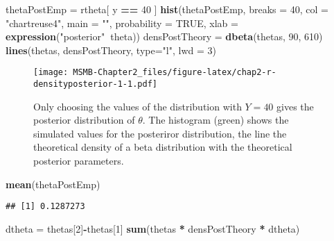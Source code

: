 \documentclass[]{article}
\newenvironment{Shaded}{\begin{snugshade}}{\end{snugshade}}
\newcommand{\KeywordTok}[1]{\textcolor[rgb]{0.13,0.29,0.53}{\textbf{#1}}}
\newcommand{\DataTypeTok}[1]{\textcolor[rgb]{0.13,0.29,0.53}{#1}}
\newcommand{\DecValTok}[1]{\textcolor[rgb]{0.00,0.00,0.81}{#1}}
\newcommand{\StringTok}[1]{\textcolor[rgb]{0.31,0.60,0.02}{#1}}
\newcommand{\OtherTok}[1]{\textcolor[rgb]{0.56,0.35,0.01}{#1}}
\newcommand{\OperatorTok}[1]{\textcolor[rgb]{0.81,0.36,0.00}{\textbf{#1}}}
\newcommand{\NormalTok}[1]{#1}
\begin{document}
\begin{Shaded}
\begin{Highlighting}[]
\NormalTok{thetaPostEmp =}\StringTok{ }\NormalTok{rtheta[ y }\OperatorTok{==}\StringTok{ }\DecValTok{40}\NormalTok{ ]}
\KeywordTok{hist}\NormalTok{(thetaPostEmp, }\DataTypeTok{breaks =} \DecValTok{40}\NormalTok{, }\DataTypeTok{col =} \StringTok{"chartreuse4"}\NormalTok{, }\DataTypeTok{main =} \StringTok{""}\NormalTok{,}
     \DataTypeTok{probability =} \OtherTok{TRUE}\NormalTok{, }\DataTypeTok{xlab =} \KeywordTok{expression}\NormalTok{(}\StringTok{"posterior"}\OperatorTok{~}\NormalTok{theta))}
\NormalTok{densPostTheory  =}\StringTok{  }\KeywordTok{dbeta}\NormalTok{(thetas, }\DecValTok{90}\NormalTok{, }\DecValTok{610}\NormalTok{)}
\KeywordTok{lines}\NormalTok{(thetas, densPostTheory, }\DataTypeTok{type=}\StringTok{"l"}\NormalTok{, }\DataTypeTok{lwd =} \DecValTok{3}\NormalTok{)}
\end{Highlighting}
\end{Shaded}

\begin{figure}
\centering
\texttt{[image: MSMB-Chapter2\_files/figure-latex/chap2-r-densityposterior-1-1.pdf]}
\caption{Only choosing the values of the distribution with \(Y=40\)
gives the posterior distribution of \(\theta\). The histogram (green)
shows the simulated values for the posteriror distribution, the line the
theoretical density of a beta distribution with the theoretical
posterior parameters.}
\end{figure}

\begin{Shaded}
\begin{Highlighting}[]
\KeywordTok{mean}\NormalTok{(thetaPostEmp)}
\end{Highlighting}
\end{Shaded}

\begin{verbatim}
## [1] 0.1287273
\end{verbatim}

\begin{Shaded}
\begin{Highlighting}[]
\NormalTok{dtheta =}\StringTok{ }\NormalTok{thetas[}\DecValTok{2}\NormalTok{]}\OperatorTok{-}\NormalTok{thetas[}\DecValTok{1}\NormalTok{]}
\KeywordTok{sum}\NormalTok{(thetas }\OperatorTok{*}\StringTok{ }\NormalTok{densPostTheory }\OperatorTok{*}\StringTok{ }\NormalTok{dtheta)}
\end{Highlighting}
\end{Shaded}
\end{document}

